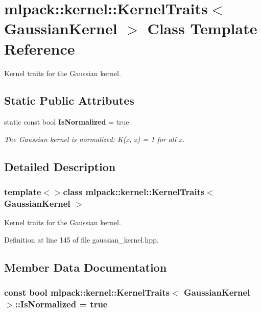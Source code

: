 \section{mlpack\-:\-:kernel\-:\-:Kernel\-Traits$<$ Gaussian\-Kernel $>$ Class Template Reference}
\label{classmlpack_1_1kernel_1_1KernelTraits_3_01GaussianKernel_01_4}


Kernel traits for the Gaussian kernel.  


\subsection*{Static Public Attributes}
\begin{DoxyCompactItemize}
\item 
static const bool {\bf Is\-Normalized} = true
\begin{DoxyCompactList}\small\item\em The Gaussian kernel is normalized\-: K(x, x) = 1 for all x. \end{DoxyCompactList}\end{DoxyCompactItemize}


\subsection{Detailed Description}
\subsubsection*{template$<$$>$class mlpack\-::kernel\-::\-Kernel\-Traits$<$ Gaussian\-Kernel $>$}

Kernel traits for the Gaussian kernel. 

Definition at line 145 of file gaussian\-\_\-kernel.\-hpp.



\subsection{Member Data Documentation}
\subsubsection[{Is\-Normalized}]{\setlength{\rightskip}{0pt plus 5cm}const bool {\bf mlpack\-::kernel\-::\-Kernel\-Traits}$<$ {\bf Gaussian\-Kernel} $>$\-::Is\-Normalized = true\hspace{0.3cm}{\ttfamily [static]}}\label{classmlpack_1_1kernel_1_1KernelTraits_3_01GaussianKernel_01_4_a05bdf2730803d7205420dc6d3fd35f87}


